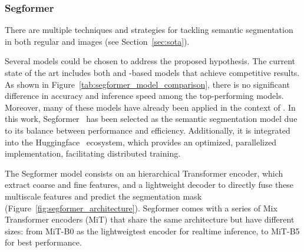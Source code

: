 \subsubsection{Segformer}
There are multiple techniques and strategies for tackling semantic segmentation in both regular and  images (see Section~\ref{sec:sota}).  

Several models could be chosen to address the proposed hypothesis. The current state of the art includes both  and -based models that achieve competitive results. As shown in Figure~\ref{tab:segformer_model_comparison}, there is no significant difference in accuracy and inference speed among the top-performing models. Moreover, many of these models have already been applied in the context of . In this work, Segformer~\cite{segformer} has been selected as the semantic segmentation model due to its balance between performance and efficiency. Additionally, it is integrated into the Huggingface~\cite{huggingface} ecosystem, which provides an optimized, parallelized implementation, facilitating distributed training.  

\begin{table}[h]
    \centering
    \caption{Comparison of different models. Results are obtained from \cite{DDRNet} \cite{PIDNet} \cite{segformer}.  }
    \label{tab:segformer_model_comparison}
\end{table}


The Segformer model consists on an hierarchical Transformer  encoder, which extract coarse and fine features, and a lightweight  decoder to directly fuse these multiscale features and predict the segmentation mask (Figure~\ref{fig:segformer_architecture}). Segformer comes with a series of Mix Transformer encoders (MiT) that share the same architecture but have different sizes: from MiT-B0 as the lightweigtest encoder for realtime inference, to MiT-B5 for best performance.

